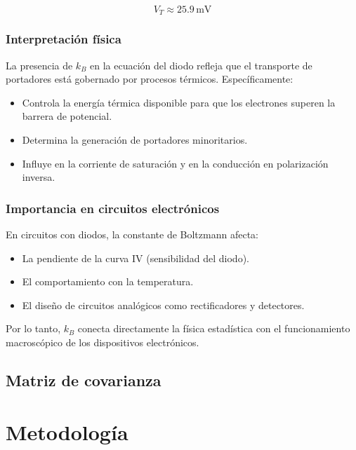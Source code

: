\documentclass[twocolumn]{revtex4-2}
\begin{document}
\begin{equation}
V_T \approx 25.9 \, \text{mV}
\end{equation}

\subsubsection{Interpretación física}

La presencia de $k_B$ en la ecuación del diodo refleja que el transporte de portadores está gobernado por procesos térmicos. Específicamente:

\begin{itemize}
    \item Controla la energía térmica disponible para que los electrones superen la barrera de potencial.
    \item Determina la generación de portadores minoritarios.
    \item Influye en la corriente de saturación y en la conducción en polarización inversa.
\end{itemize}

\subsubsection{Importancia en circuitos electrónicos}

En circuitos con diodos, la constante de Boltzmann afecta:

\begin{itemize}
    \item La pendiente de la curva IV (sensibilidad del diodo).
    \item El comportamiento con la temperatura.
    \item El diseño de circuitos analógicos como rectificadores y detectores.
\end{itemize}

Por lo tanto, $k_B$ conecta directamente la física estadística con el funcionamiento macroscópico de los dispositivos electrónicos.
\subsection{Matriz de covarianza}



\section{Metodología}
\end{document}
